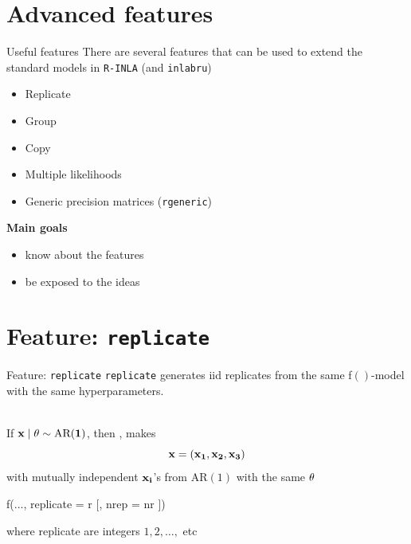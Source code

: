 \documentclass[
  ignorenonframetext,
  handout]{beamer}
\newenvironment{Shaded}{\begin{snugshade}}{\end{snugshade}}
\newcommand{\AttributeTok}[1]{\textcolor[rgb]{0.77,0.63,0.00}{#1}}
\newcommand{\FunctionTok}[1]{\textcolor[rgb]{0.00,0.00,0.00}{#1}}
\newcommand{\NormalTok}[1]{#1}
\providecommand{\tightlist}{%
  \setlength{\itemsep}{0pt}\setlength{\parskip}{0pt}}
\begin{document}
\hypertarget{advanced-features}{%
\section{Advanced features}\label{advanced-features}}

\begin{frame}[fragile]{Useful features}
\protect\hypertarget{useful-features}{}
There are several features that can be used to extend the standard
models in \texttt{R-INLA} (and \texttt{inlabru})

\begin{itemize}
\item
  Replicate
\item
  Group
\item
  Copy
\item
  Multiple likelihoods
\item
  Generic precision matrices (\texttt{rgeneric})
\end{itemize}

\textbf{Main goals}

\begin{itemize}
\tightlist
\item
  know about the features
\item
  be exposed to the ideas
\end{itemize}
\end{frame}

\hypertarget{feature-replicate}{%
\section{\texorpdfstring{Feature:
\texttt{replicate}}{Feature: replicate}}\label{feature-replicate}}

\begin{frame}[fragile]{Feature: \texttt{replicate}}
\protect\hypertarget{feature-replicate-1}{}
\texttt{replicate} generates iid replicates from the same f\(()\)-model
with the same hyperparameters.\\
\strut \\
If \(\bf{x}\mid\bf{\theta} \sim \text{AR}(1)\), then ,
makes \[
\bf{x} = ({\bf x}_{1}, {\bf x}_{2}, {\bf x}_{3})
\] with mutually independent \(\bf{x}_{i}\)'s from AR\((1)\) with the
same \(\bf{\theta}\)

\begin{Shaded}
\begin{Highlighting}[]
    \FunctionTok{f}\NormalTok{(..., }\AttributeTok{replicate =}\NormalTok{ r [, }\AttributeTok{nrep =}\NormalTok{ nr ])}
\end{Highlighting}
\end{Shaded}

where replicate are integers \(1, 2, \ldots,\) etc
\end{frame}
\end{document}
